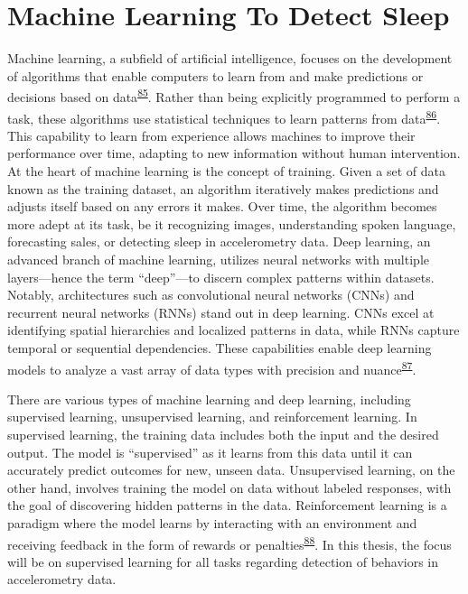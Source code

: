 \documentclass[
  10pt,
]{scrbook}
\begin{document}
\hypertarget{machine-learning-to-detect-sleep}{%
\section{Machine Learning To Detect
Sleep}\label{machine-learning-to-detect-sleep}}

Machine learning, a subfield of artificial intelligence, focuses on the
development of algorithms that enable computers to learn from and make
predictions or decisions based on
data\textsuperscript{\protect\hyperlink{ref-hastie01statisticallearning}{85}}.
Rather than being explicitly programmed to perform a task, these
algorithms use statistical techniques to learn patterns from
data\textsuperscript{\protect\hyperlink{ref-bishop_2006}{86}}. This
capability to learn from experience allows machines to improve their
performance over time, adapting to new information without human
intervention. At the heart of machine learning is the concept of
training. Given a set of data known as the training dataset, an
algorithm iteratively makes predictions and adjusts itself based on any
errors it makes. Over time, the algorithm becomes more adept at its
task, be it recognizing images, understanding spoken language,
forecasting sales, or detecting sleep in accelerometry data. Deep
learning, an advanced branch of machine learning, utilizes neural
networks with multiple layers---hence the term ``deep''---to discern
complex patterns within datasets. Notably, architectures such as
convolutional neural networks (CNNs) and recurrent neural networks
(RNNs) stand out in deep learning. CNNs excel at identifying spatial
hierarchies and localized patterns in data, while RNNs capture temporal
or sequential dependencies. These capabilities enable deep learning
models to analyze a vast array of data types with precision and
nuance\textsuperscript{\protect\hyperlink{ref-Goodfellow-et-al-2016}{87}}.

There are various types of machine learning and deep learning, including
supervised learning, unsupervised learning, and reinforcement learning.
In supervised learning, the training data includes both the input and
the desired output. The model is ``supervised'' as it learns from this
data until it can accurately predict outcomes for new, unseen data.
Unsupervised learning, on the other hand, involves training the model on
data without labeled responses, with the goal of discovering hidden
patterns in the data. Reinforcement learning is a paradigm where the
model learns by interacting with an environment and receiving feedback
in the form of rewards or
penalties\textsuperscript{\protect\hyperlink{ref-sutton_1998}{88}}. In
this thesis, the focus will be on supervised learning for all tasks
regarding detection of behaviors in accelerometry data.
\end{document}
